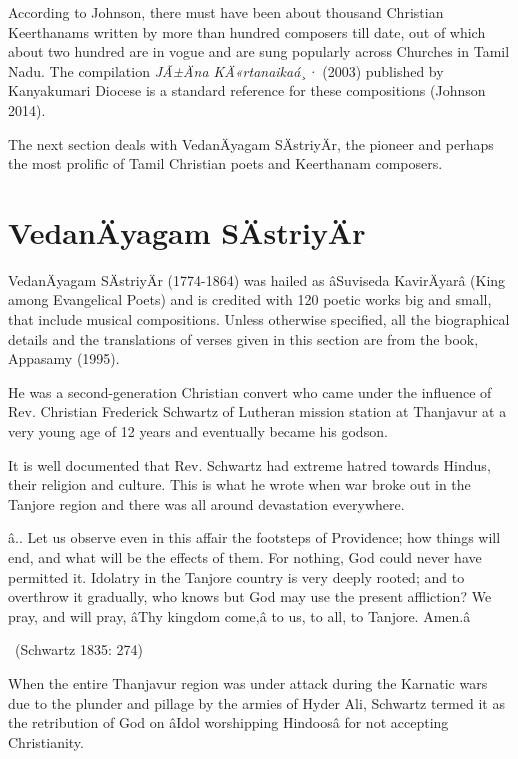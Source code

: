According to Johnson, there must have been about thousand Christian Keerthanams written by more than hundred composers till date, out of which about two hundred are in vogue and are sung popularly across Churches in Tamil Nadu. The compilation \textit{JÃ±Äna KÄ«rtanaikaá¸·} (2003) published by Kanyakumari Diocese is a standard reference for these compositions (Johnson 2014).

The next section deals with VedanÄyagam SÄstriyÄr, the pioneer and perhaps the most prolific of Tamil Christian poets and Keerthanam composers.


\section*{VedanÄyagam SÄstriyÄr}

VedanÄyagam SÄstriyÄr (1774-1864) was hailed as âSuviseda KavirÄyarâ (King among Evangelical Poets) and is credited with 120 poetic works big and small, that include musical compositions. Unless otherwise specified, all the biographical details and the translations of verses given in this section are from the book, Appasamy (1995).

He was a second-generation Christian convert who came under the influence of Rev. Christian Frederick Schwartz of Lutheran mission station at Thanjavur at a very young age of 12 years and eventually became his godson.

It is well documented that Rev. Schwartz had extreme hatred towards Hindus, their religion and culture. This is what he wrote when war broke out in the Tanjore region and there was all around devastation everywhere.

\begin{myquote}
â.. Let us observe even in this affair the footsteps of Providence; how things will end, and what will be the effects of them. For nothing, God could never have permitted it. Idolatry in the Tanjore country is very deeply rooted; and to overthrow it gradually, who knows but God may use the present affliction? We pray, and will pray, âThy kingdom come,â to us, to all, to Tanjore. Amen.â 

~\hfill (Schwartz 1835: 274)
\end{myquote}

When the entire Thanjavur region was under attack during the Karnatic wars due to the plunder and pillage by the armies of Hyder Ali, Schwartz termed it as the retribution of God on âIdol worshipping Hindoosâ for not accepting Christianity.

